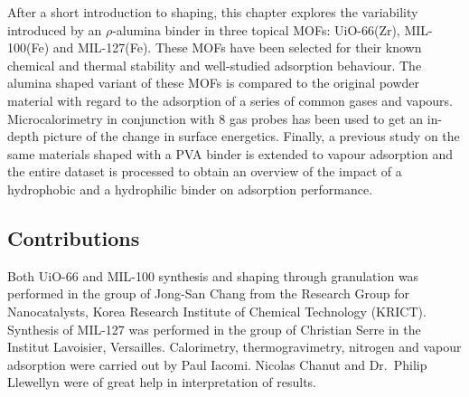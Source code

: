 After a short introduction to shaping, this chapter explores the 
variability introduced by an \( \rho \)-alumina binder in three 
topical \glspl{MOF}: UiO-66(Zr), MIL-100(Fe) and MIL-127(Fe). These \glspl{MOF} 
have been selected for their known chemical and thermal stability 
and well-studied adsorption behaviour.
The alumina shaped variant of these \glspl{MOF} is compared to the original
powder material with regard to the adsorption of a series of common
gases and vapours. Microcalorimetry in conjunction with 8 gas probes
has been used to get an in-depth picture of the change in surface
energetics.
Finally, a previous study on the same materials shaped with a \gls{PVA}
binder is extended to vapour adsorption and the entire
dataset is processed to obtain an overview of the impact of a
hydrophobic and a hydrophilic binder on adsorption performance.

\subsection*{Contributions}

Both UiO-66 and MIL-100 synthesis and shaping through granulation was performed
in the group of Jong-San Chang from the Research Group for Nanocatalysts,
Korea Research Institute of Chemical Technology (KRICT). Synthesis 
of MIL-127 was performed in the group of Christian Serre in 
the Institut Lavoisier, Versailles. Calorimetry,
thermogravimetry, nitrogen and vapour adsorption were carried out by
Paul Iacomi. Nicolas Chanut and Dr.\ Philip Llewellyn were of great help
in interpretation of results.

